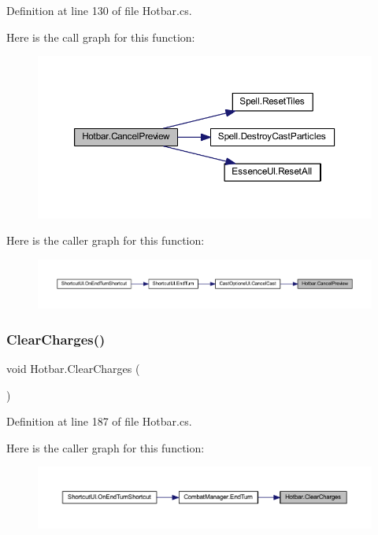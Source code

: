 Definition at line 130 of file Hotbar.\+cs.

Here is the call graph for this function\+:
\nopagebreak
\begin{figure}[H]
\begin{center}
\leavevmode
\includegraphics[width=350pt]{class_hotbar_a0c213365074f45fd1b1010eabe3f3d4d_cgraph}
\end{center}
\end{figure}
Here is the caller graph for this function\+:
\nopagebreak
\begin{figure}[H]
\begin{center}
\leavevmode
\includegraphics[width=350pt]{class_hotbar_a0c213365074f45fd1b1010eabe3f3d4d_icgraph}
\end{center}
\end{figure}
\mbox{\label{class_hotbar_ab54a6d27db19b4ed21014a782d74b3d1}} 
\subsubsection{\texorpdfstring{ClearCharges()}{ClearCharges()}}
{\footnotesize\ttfamily void Hotbar.\+Clear\+Charges (\begin{DoxyParamCaption}{ }\end{DoxyParamCaption})}



Definition at line 187 of file Hotbar.\+cs.

Here is the caller graph for this function\+:
\nopagebreak
\begin{figure}[H]
\begin{center}
\leavevmode
\includegraphics[width=350pt]{class_hotbar_ab54a6d27db19b4ed21014a782d74b3d1_icgraph}
\end{center}
\end{figure}
\mbox{\label{class_hotbar_a535ef71789d10c417b86bdd194e3e5b7}} 
